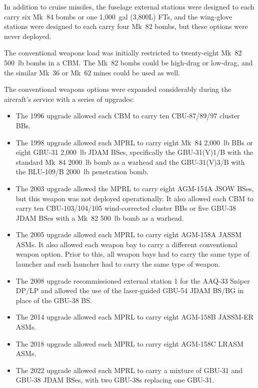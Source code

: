 In addition to cruise missiles, the fuselage external stations were designed to each carry six Mk~84 bombs or one 1,000~gal (3,800L) FTs, and the wing-glove stations were designed to each carry four Mk~82 bombs, but these options were never deployed.

The conventional weapons load was initially restricted to twenty-eight Mk~82 500~lb bombs in a CBM. The Mk~82 bombs could be high-drag or low-drag, and the similar Mk~36 or Mk~62 mines could be used as well.

The conventional weapons options were expanded considerably during the aircraft's service with a series of upgrades:
\begin{itemize}

    \item The 1996 upgrade allowed each CBM to carry ten CBU-87/89/97 cluster BBs.

    \item The 1998 upgrade allowed each MPRL to carry eight Mk~84 2,000~lb BBs or eight GBU-31 2,000~lb JDAM BSes, specifically the GBU-31(V)1/B with the standard Mk~84 2000~lb bomb as a warhead and the GBU-31(V)3/B with the BLU-109/B 2000~lb penetration bomb.

    \item The 2003 upgrade allowed the MPRL to carry eight AGM-154A JSOW BSes, but this weapon was not deployed operationally. It also allowed each CBM to carry ten CBU-103/104/105 wind-corrected cluster BBs or five GBU-38 JDAM BSes with a Mk~82 500~lb bomb as a warhead.

    \item The 2005 upgrade allowed each MPRL to carry eight AGM-158A JASSM ASMs. It also allowed each weapon bay to carry a different conventional weapon option. Prior to this, all weapon bays had to carry the same type of launcher and each launcher had to carry the same type of weapon.

    \item The 2008 upgrade recommissioned external station 1 for the AAQ-33 Sniper DP/LP and allowed the use of the laser-guided GBU-54 JDAM BS/BG in place of the GBU-38 BS.

    \item The 2014 upgrade allowed each MPRL to carry eight AGM-158B JASSM-ER ASMs.

    \item The 2018 upgrade allowed each MPRL to carry eight AGM-158C LRASM ASMs.

    \item The 2022 upgrade allowed each MPRL to carry a mixture of GBU-31 and GBU-38 JDAM BSes, with two GBU-38s replacing one GBU-31.

\end{itemize}

